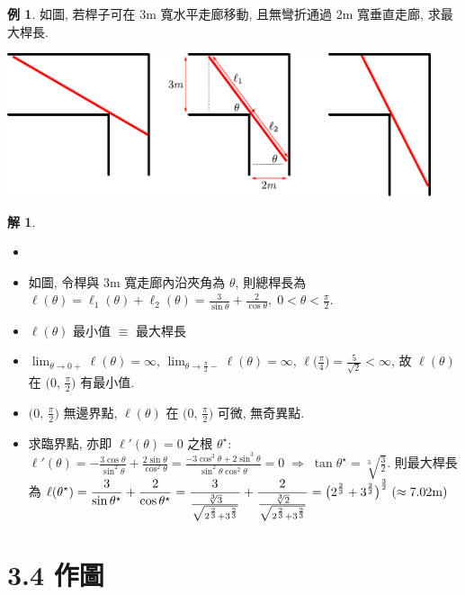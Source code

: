 \documentclass[12pt]{extarticle}
\newcommand{\ds}{\displaystyle}
\newcommand{\ie}{\;\Longrightarrow\;}
\theoremstyle{definition}
\newtheorem*{ex}{例}
\newtheorem*{sol}{解}
\begin{document}
\begin{ex}
  如圖, 若桿子可在 $3$m 寬水平走廊移動, 且無彎折通過 $2$m 寬垂直走廊, 求最大桿長. 
  \begin{center}
    \includegraphics[height=4.2cm]{fig/corridor.pdf}
  \end{center}
\end{ex}

\begin{sol}
  \begin{itemize}\setlength\itemsep{0em}
    \item[]
    \item 如圖, 令桿與 $3$m 寬走廊內沿夾角為 $\theta$, 則總桿長為 $\ds \ell(\theta) = \ell_1(\theta) +\ell_2(\theta) = \frac{3}{\sin\theta}+\frac{2}{\cos\theta},\;0 < \theta < \frac{\pi}{2}$. 
    \item $\ds\ell(\theta)$ 最小值 $\equiv$ 最大桿長 
    \item $\ds\lim_{\theta\to 0+}\ell(\theta) = \infty$, $\ds\lim_{\theta\to\frac{\pi}{2}-}\ell(\theta) = \infty$, $\ds\ell\big(\frac{\pi}{4}\big) = \frac{5}{\sqrt{2}} < \infty$, 故 $\ell(\theta)$ 在 $\ds\big(0,\,\frac{\pi}{2}\big)$ 有最小值. 
    \item $\ds\big(0,\,\frac{\pi}{2}\big)$ 無邊界點, $\ds\ell(\theta)$ 在 $\ds\big(0,\,\frac{\pi}{2}\big)$ 可微, 無奇異點. 
    \item 求臨界點, 亦即 $\ds\ell'(\theta) = 0$ 之根 $\theta^\star$: $\ds\ell'(\theta) = -\frac{3 \cos\theta}{\sin^2\theta} + \frac{2\sin\theta}{\cos^2\theta} = \frac{-3\cos^3\theta +2 \sin^3\theta}{\sin^2\theta\cos^2\theta} = 0\ie\tan\theta^\star = \sqrt[3]{\frac{3}{2}}$. 則最大桿長為 $\ds\ell(\theta^\star) = \frac{3}{\sin\theta^\star} + \frac{2}{\cos\theta^\star} =\frac{3}{\frac{\root 3\of 3}{\sqrt{2^{\frac{2}{3}}+3^{\frac{2}{3}}}}} +\frac{2}{\frac{\root 3\of 2}{\sqrt{2^{\frac{2}{3}}+3^{\frac{2}{3}}}}} = {\big(2^{\frac{2}{3}}+3^{\frac{2}{3}}\big)}^{\frac{3}{2}}\;(\approx 7.02 \text{m})$
  \end{itemize}
\end{sol}

\section*{3.4 作圖}
\end{document}
